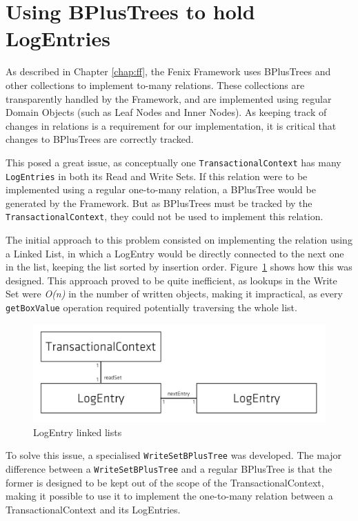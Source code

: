 \section{Using BPlusTrees to hold LogEntries}

As described in Chapter \ref{chap:ff}, the Fenix Framework uses
BPlusTrees and other collections to implement to-many relations. These
collections are transparently handled by the Framework, and are
implemented using regular Domain Objects (such as Leaf Nodes and Inner
Nodes). As keeping track of changes in relations is a requirement for
our implementation, it is critical that changes to BPlusTrees are
correctly tracked.

This posed a great issue, as conceptually one
\texttt{TransactionalContext} has many \texttt{LogEntries} in both its
Read and Write Sets. If this relation were to be implemented using a
regular one-to-many relation, a BPlusTree would be generated by the
Framework. But as BPlusTrees must be tracked by the
\texttt{TransactionalContext}, they could not be used to implement
this relation.

The initial approach to this problem consisted on implementing the
relation using a Linked List, in which a LogEntry would be directly
connected to the next one in the list, keeping the list sorted by
insertion order. Figure~\ref{fig:linkedList} shows how this was
designed. This approach proved to be quite inefficient, as lookups in
the Write Set were {\it O(n)} in the number of written objects, making
it impractical, as every \texttt{getBoxValue} operation required
potentially traversing the whole list.

\begin{figure}
\centering
\includegraphics[width=0.7\linewidth]{tx-context-v1}
\caption{LogEntry linked lists}
\label{fig:linkedList}
\end{figure}

To solve this issue, a specialised \texttt{WriteSetBPlusTree} was
developed. The major difference between a \texttt{WriteSetBPlusTree}
and a regular BPlusTree is that the former is designed to be kept out
of the scope of the TransactionalContext, making it possible to use it
to implement the one-to-many relation between a TransactionalContext
and its LogEntries.

